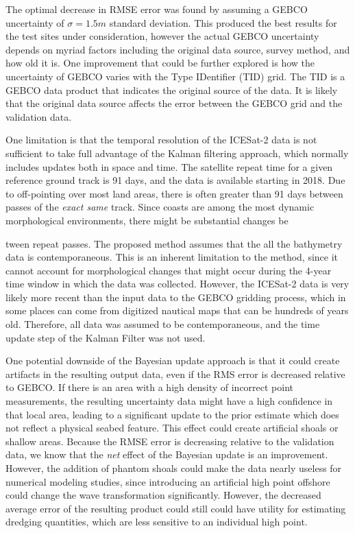 The optimal decrease in RMSE error was found by assuming a GEBCO uncertainty of $\sigma=1.5m$ standard deviation. This produced the best results for the test sites under consideration, however the actual GEBCO uncertainty depends on myriad factors including the original data source, survey method, and how old it is. One improvement that could be further explored is how the uncertainty of GEBCO varies with the Type IDentifier (TID) grid. The TID is a GEBCO data product that indicates the original source of the data. It is likely that the original data source affects the error between the GEBCO grid and the validation data.

One limitation is that the temporal resolution of the ICESat-2 data is not sufficient to take full advantage of the Kalman filtering approach, which normally includes updates both in space and time. The satellite repeat time for a given reference ground track is 91 days, and the data is available starting in 2018. Due to off-pointing over most land areas, there is often greater than 91 days between passes of the \emph{exact same} track. Since coasts are among the most dynamic morphological environments, there might be substantial changes be

tween repeat passes. The proposed method assumes that the all the bathymetry data is contemporaneous. This is an inherent limitation to the method, since it cannot account for morphological changes that might occur during the 4-year time window in which the data was collected. However, the ICESat-2 data is very likely more recent than the input data to the GEBCO gridding process, which in some places can come from digitized nautical maps that can be hundreds of years old. Therefore, all data was assumed to be contemporaneous, and the time update step of the Kalman Filter was not used.


One potential downside of the Bayesian update approach is that it could create artifacts in the resulting output data, even if the RMS error is decreased relative to GEBCO. If there is an area with a high density of incorrect point measurements, the resulting uncertainty data might have a high confidence in that local area, leading to a significant update to the prior estimate which does not reflect a physical seabed  feature. This effect could create artificial shoals or shallow areas.  Because the RMSE error is decreasing relative to the validation data, we know that the \emph{net} effect of the Bayesian update is an improvement. However, the addition of phantom shoals could make the data nearly useless for numerical modeling studies, since introducing an artificial high point offshore could change the wave transformation significantly. However, the decreased average error of the resulting product could still could have utility for estimating dredging quantities, which are less sensitive to an individual high point. 